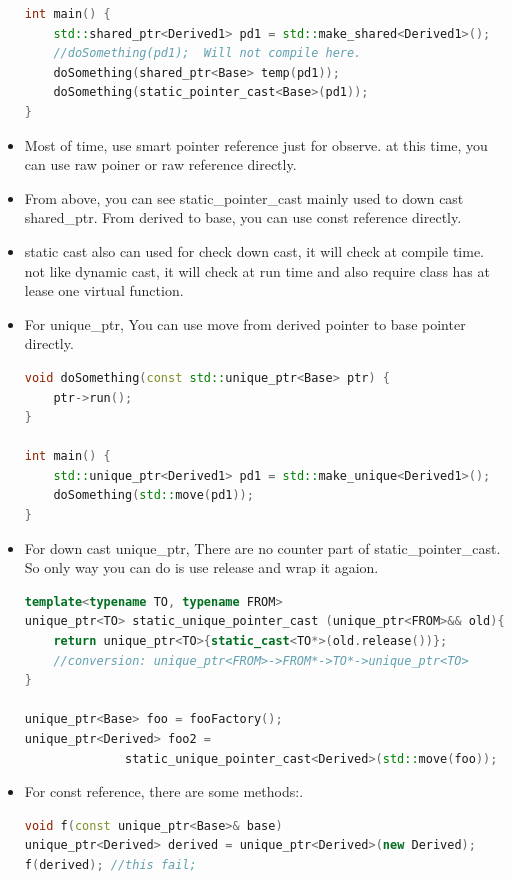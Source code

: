 \documentclass[a4paper,11pt,twoside]{book}
\begin{document}
\begin{itemize}
\begin{lstlisting}[frame=single, language=c++, mathescape=true]
int main() {
	std::shared_ptr<Derived1> pd1 = std::make_shared<Derived1>();
	//doSomething(pd1);  Will not compile here.
	doSomething(shared_ptr<Base> temp(pd1));
	doSomething(static_pointer_cast<Base>(pd1));
}
\end{lstlisting}


\item Most of time, use smart pointer reference just for observe. at this time, you can use raw poiner or raw reference directly. 

\item From above, you can see static\_pointer\_cast mainly used to down cast shared\_ptr. From derived to base, you can use const reference directly.

\item static cast also can used for check down cast, it will check at compile time. not like dynamic cast, it will check at run time and also require class has at lease one virtual function.


\item For unique\_ptr, You can use move from derived pointer to base pointer directly.
\begin{lstlisting}[frame=single, language=c++, mathescape=true]
void doSomething(const std::unique_ptr<Base> ptr) {
    ptr->run();
}

int main() {
    std::unique_ptr<Derived1> pd1 = std::make_unique<Derived1>();
    doSomething(std::move(pd1));
}
\end{lstlisting}

\item For down cast unique\_ptr, There are no counter part of static\_pointer\_cast. So only way you can do is use release and wrap it agaion.

\begin{lstlisting}[frame=single, language=c++, mathescape=true]
template<typename TO, typename FROM>
unique_ptr<TO> static_unique_pointer_cast (unique_ptr<FROM>&& old){
	return unique_ptr<TO>{static_cast<TO*>(old.release())};
	//conversion: unique_ptr<FROM>->FROM*->TO*->unique_ptr<TO>
}

unique_ptr<Base> foo = fooFactory();
unique_ptr<Derived> foo2 = 
              static_unique_pointer_cast<Derived>(std::move(foo));
\end{lstlisting}

\item For const reference, there are some methods:.
\begin{lstlisting}[frame=single, language=c++, mathescape=true]
void f(const unique_ptr<Base>& base)
unique_ptr<Derived> derived = unique_ptr<Derived>(new Derived);
f(derived); //this fail;


\end{lstlisting}
\end{itemize}
\end{document}
